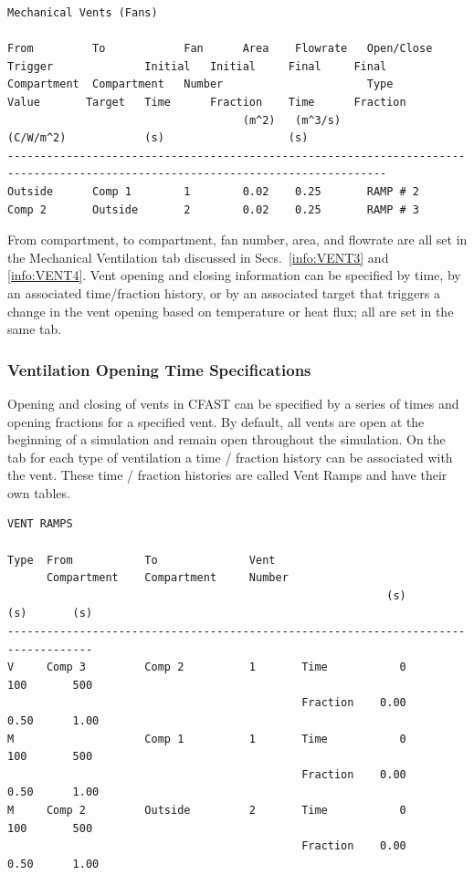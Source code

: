 \begin{lstlisting}[basicstyle=\tiny]
Mechanical Vents (Fans)

From         To            Fan      Area    Flowrate   Open/Close  Trigger              Initial   Initial     Final     Final
Compartment  Compartment   Number                      Type        Value       Target   Time      Fraction    Time      Fraction
                                    (m^2)   (m^3/s)                (C/W/m^2)            (s)                   (s)
--------------------------------------------------------------------------------------------------------------------------------
Outside      Comp 1        1        0.02    0.25       RAMP # 2
Comp 2       Outside       2        0.02    0.25       RAMP # 3
\end{lstlisting}
From compartment, to compartment, fan number, area, and flowrate are all set in the Mechanical Ventilation tab discussed in Secs.~\ref{info:VENT3} and \ref{info:VENT4}.  Vent opening and closing information can be specified by time, by an associated time/fraction history, or by an associated target that triggers a change in the vent opening based on temperature or heat flux; all are set in the same tab.


\subsubsection{Ventilation Opening Time Specifications}

Opening and closing of vents in CFAST can be specified by a series of times and opening fractions for a specified vent. By default, all vents are open at the beginning of a simulation and remain open throughout the simulation. On the tab for each type of ventilation a time / fraction history can be associated with the vent. These time / fraction histories are called Vent Ramps and have their own tables.
\begin{lstlisting}[basicstyle=\tiny]
VENT RAMPS

Type  From           To              Vent
      Compartment    Compartment     Number
                                                          (s)       (s)       (s)
-----------------------------------------------------------------------------------
V     Comp 3         Comp 2          1       Time           0       100       500
                                             Fraction    0.00      0.50      1.00
M                    Comp 1          1       Time           0       100       500
                                             Fraction    0.00      0.50      1.00
M     Comp 2         Outside         2       Time           0       100       500
                                             Fraction    0.00      0.50      1.00
\end{lstlisting}

